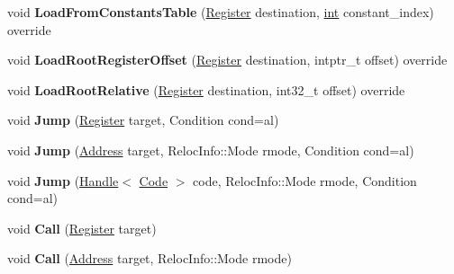 \begin{DoxyCompactItemize}
void {\bfseries Load\+From\+Constants\+Table} (\mbox{\hyperlink{classv8_1_1internal_1_1Register}{Register}} destination, \mbox{\hyperlink{classint}{int}} constant\+\_\+index) override
\item 
\mbox{\label{classv8_1_1internal_1_1TurboAssembler_a20588856c39f30350ccd570332e761ea}} 
void {\bfseries Load\+Root\+Register\+Offset} (\mbox{\hyperlink{classv8_1_1internal_1_1Register}{Register}} destination, intptr\+\_\+t offset) override
\item 
\mbox{\label{classv8_1_1internal_1_1TurboAssembler_a77e9d10255bc9a25985ff71df883e665}} 
void {\bfseries Load\+Root\+Relative} (\mbox{\hyperlink{classv8_1_1internal_1_1Register}{Register}} destination, int32\+\_\+t offset) override
\item 
\mbox{\label{classv8_1_1internal_1_1TurboAssembler_a00b649e07417eefbf242c5583f9bb1d2}} 
void {\bfseries Jump} (\mbox{\hyperlink{classv8_1_1internal_1_1Register}{Register}} target, Condition cond=al)
\item 
\mbox{\label{classv8_1_1internal_1_1TurboAssembler_a70d82703c3ebf605197b18749ac052ba}} 
void {\bfseries Jump} (\mbox{\hyperlink{classuintptr__t}{Address}} target, Reloc\+Info\+::\+Mode rmode, Condition cond=al)
\item 
\mbox{\label{classv8_1_1internal_1_1TurboAssembler_a51d9089ea6fb8d14ac1281bd3063b9c1}} 
void {\bfseries Jump} (\mbox{\hyperlink{classv8_1_1internal_1_1Handle}{Handle}}$<$ \mbox{\hyperlink{classv8_1_1internal_1_1Code}{Code}} $>$ code, Reloc\+Info\+::\+Mode rmode, Condition cond=al)
\item 
\mbox{\label{classv8_1_1internal_1_1TurboAssembler_acd7e5c487db1d9b1444e1f72865677f7}} 
void {\bfseries Call} (\mbox{\hyperlink{classv8_1_1internal_1_1Register}{Register}} target)
\item 
\mbox{\label{classv8_1_1internal_1_1TurboAssembler_a1e0205028f8cd40b5a92083046a045be}} 
void {\bfseries Call} (\mbox{\hyperlink{classuintptr__t}{Address}} target, Reloc\+Info\+::\+Mode rmode)

\end{DoxyCompactItemize}
